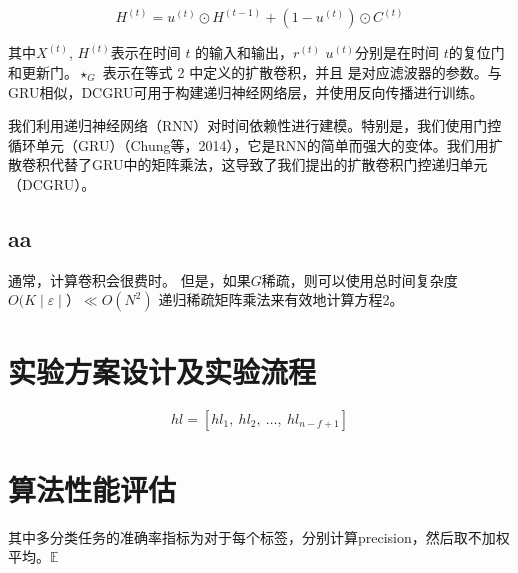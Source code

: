 \begin{equation}
    H^{(t)} = u^{(t)}\odot H^{(t-1)} + (1 - u^{(t)}) \odot C^{(t)}
\end{equation}

其中$X^{(t)}$, $H^{(t)}$表示在时间 $t$ 的输入和输出，$r^{(t)}$ $u^{(t)}$分别是在时间 $t$的复位门和更新门。$\star_G$  表示在等式 2 中定义的扩散卷积，并且  是对应滤波器的参数。与GRU相似，DCGRU可用于构建递归神经网络层，并使用反向传播进行训练。

我们利用递归神经网络（RNN）对时间依赖性进行建模。特别是，我们使用门控循环单元（GRU）（Chung等，2014），它是RNN的简单而强大的变体。我们用扩散卷积代替了GRU中的矩阵乘法，这导致了我们提出的扩散卷积门控递归单元（DCGRU）。

\subsection{aa}
通常，计算卷积会很费时。 但是，如果$G$稀疏，则可以使用总时间复杂度 $O(K \mid \varepsilon \mid）\ll O(N^ 2)$ 递归稀疏矩阵乘法来有效地计算方程2。


\section{实验方案设计及实验流程}
\begin{equation*} hl=[hl_{1},\ hl_{2},\ \ldots,\ hl_{n-f+1}] \tag{-} \end{equation*}

\section{算法性能评估}

其中多分类任务的准确率指标为对于每个标签，分别计算precision，然后取不加权平均。$\mathbb{E}$

